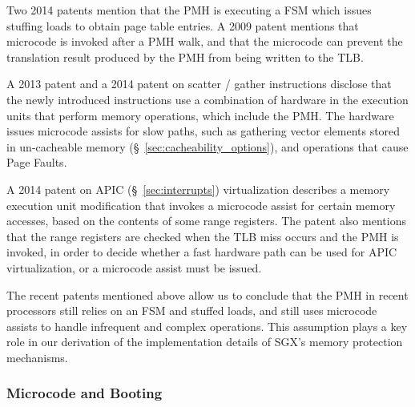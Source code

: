 
Two 2014 patents \cite{hildesheim2014ptm, raikin2014tlb} mention that the PMH
is executing a FSM which issues stuffing loads to obtain page table entries.
A 2009 patent \cite{intel2009pipeline} mentions that microcode is invoked after
a PMH walk, and that the microcode can prevent the translation result produced
by the PMH from being written to the TLB.


A 2013 patent \cite{intel2013scattergather} and a 2014 patent
\cite{intel2014gather} on scatter / gather instructions disclose that the newly
introduced instructions use a combination of hardware in the execution units
that perform memory operations, which include the PMH. The hardware issues
microcode assists for slow paths, such as gathering vector elements stored in
un-cacheable memory (\S~\ref{sec:cacheability_options}), and operations that
cause Page Faults.


A 2014 patent on APIC (\S~\ref{sec:interrupts}) virtualization
\cite{intel2014vapic} describes a memory execution unit modification that
invokes a microcode assist for certain memory accesses, based on the contents
of some range registers. The patent also mentions that the range registers are
checked when the TLB miss occurs and the PMH is invoked, in order to decide
whether a fast hardware path can be used for APIC virtualization, or a
microcode assist must be issued.

The recent patents mentioned above allow us to conclude that the PMH in recent
processors still relies on an FSM and stuffed loads, and still uses microcode
assists to handle infrequent and complex operations. This assumption plays a
key role in our derivation of the implementation details of SGX's memory
protection mechanisms.


\subsubsection{Microcode and Booting}

